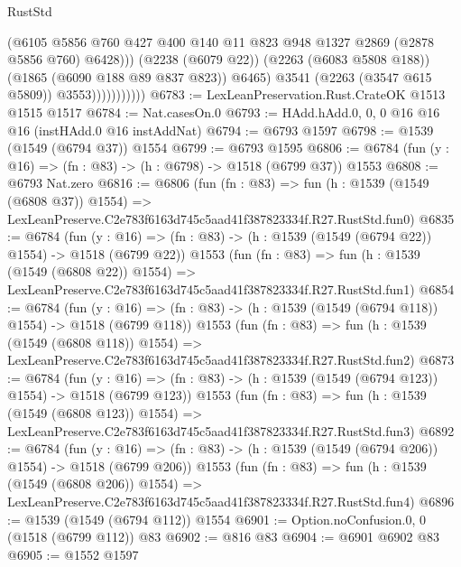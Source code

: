 \begin{lexlean}{RustStd}
\begin{coremodule}
                                (@6105
                                  @5856
                                  @760
                                  @427
                                  @400
                                  @140
                                  @11
                                  @823
                                  @948
                                  @1327
                                  @2869
                                  (@2878 @5856 @760)
                                  @6428)))
                            (@2238 (@6079 @22))
                            (@2263 (@6083 @5808 @188))
                            (@1865 (@6090 @188 @89 @837 @823))
                            @6465)
                          @3541
                          (@2263 (@3547 @615 @5809))
                          @3553)))))))))))
@6783 := LexLeanPreservation.Rust.CrateOK @1513 @1515 @1517
@6784 := Nat.casesOn.{0}
@6793 := HAdd.hAdd.{0, 0, 0} @16 @16 @16 (instHAdd.{0} @16 instAddNat)
@6794 := @6793 @1597
@6798 := @1539 (@1549 (@6794 @37)) @1554
@6799 := @6793 @1595
@6806 := @6784 (fun (y : @16) => (fn : @83) -> (h : @6798) -> @1518 (@6799 @37)) @1553
@6808 := @6793 Nat.zero
@6816 := @6806
    (fun (fn : @83) =>
    fun (h : @1539 (@1549 (@6808 @37)) @1554) =>
    LexLeanPreserve.C2e783f6163d745c5aad41f387823334f.R27.RustStd.fun0)
@6835 := @6784
    (fun (y : @16) => (fn : @83) -> (h : @1539 (@1549 (@6794 @22)) @1554) -> @1518 (@6799 @22))
    @1553
    (fun (fn : @83) =>
    fun (h : @1539 (@1549 (@6808 @22)) @1554) =>
    LexLeanPreserve.C2e783f6163d745c5aad41f387823334f.R27.RustStd.fun1)
@6854 := @6784
    (fun (y : @16) => (fn : @83) -> (h : @1539 (@1549 (@6794 @118)) @1554) -> @1518 (@6799 @118))
    @1553
    (fun (fn : @83) =>
    fun (h : @1539 (@1549 (@6808 @118)) @1554) =>
    LexLeanPreserve.C2e783f6163d745c5aad41f387823334f.R27.RustStd.fun2)
@6873 := @6784
    (fun (y : @16) => (fn : @83) -> (h : @1539 (@1549 (@6794 @123)) @1554) -> @1518 (@6799 @123))
    @1553
    (fun (fn : @83) =>
    fun (h : @1539 (@1549 (@6808 @123)) @1554) =>
    LexLeanPreserve.C2e783f6163d745c5aad41f387823334f.R27.RustStd.fun3)
@6892 := @6784
    (fun (y : @16) => (fn : @83) -> (h : @1539 (@1549 (@6794 @206)) @1554) -> @1518 (@6799 @206))
    @1553
    (fun (fn : @83) =>
    fun (h : @1539 (@1549 (@6808 @206)) @1554) =>
    LexLeanPreserve.C2e783f6163d745c5aad41f387823334f.R27.RustStd.fun4)
@6896 := @1539 (@1549 (@6794 @112)) @1554
@6901 := Option.noConfusion.{0, 0} (@1518 (@6799 @112)) @83
@6902 := @816 @83
@6904 := @6901 @6902 @83
@6905 := @1552 @1597

\end{coremodule}
\end{lexlean}
